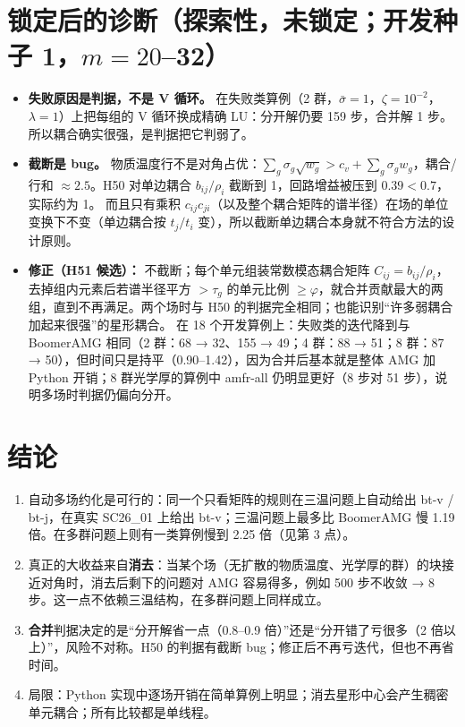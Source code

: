 \documentclass[11pt,a4paper]{ctexart}
\begin{document}
\section{锁定后的诊断（探索性，未锁定；开发种子 1，$m=20$--32）}
\begin{itemize}
\item \textbf{失败原因是判据，不是 V 循环。} 在失败类算例（2 群，$\bar\sigma=1$，$\zeta=10^{-2}$，$\lambda=1$）上把每组的 V 循环换成精确 LU：分开解仍要 159 步，合并解 1 步。所以耦合确实很强，是判据把它判弱了。
\item \textbf{截断是 bug。} 物质温度行不是对角占优：$\sum_g\sigma_g\sqrt{w_g}>c_v+\sum_g\sigma_g w_g$，耦合/行和 $\approx2.5$。H50 对单边耦合 $b_{ij}/\rho_i$ 截断到 1，回路增益被压到 $0.39<0.7$，实际约为 1。
而且只有乘积 $c_{ij}c_{ji}$（以及整个耦合矩阵的谱半径）在场的单位变换下不变（单边耦合按 $t_j/t_i$ 变），所以截断单边耦合本身就不符合方法的设计原则。
\item \textbf{修正（H51 候选）：} 不截断；每个单元组装常数模态耦合矩阵 $C_{ij}=b_{ij}/\rho_i$，去掉组内元素后若谱半径平方 $>\tau_g$ 的单元比例 $\ge\varphi$，就合并贡献最大的两组，直到不再满足。两个场时与 H50 的判据完全相同；也能识别“许多弱耦合加起来很强”的星形耦合。
在 18 个开发算例上：失败类的迭代降到与 BoomerAMG 相同（2 群：68 → 32、155 → 49；4 群：88 → 51；8 群：87 → 50），但时间只是持平（0.90--1.42），因为合并后基本就是整体 AMG 加 Python 开销；8 群光学厚的算例中 amfr-all 仍明显更好（8 步对 51 步），说明多场时判据仍偏向分开。
\end{itemize}

\section{结论}
\begin{enumerate}
\item 自动多场约化是可行的：同一个只看矩阵的规则在三温问题上自动给出 bt-v / bt-j，在真实 SC26\_01 上给出 bt-v；三温问题上最多比 BoomerAMG 慢 1.19 倍。在多群问题上则有一类算例慢到 2.25 倍（见第 3 点）。
\item 真正的大收益来自\textbf{消去}：当某个场（无扩散的物质温度、光学厚的群）的块接近对角时，消去后剩下的问题对 AMG 容易得多，例如 500 步不收敛 → 8 步。这一点不依赖三温结构，在多群问题上同样成立。
\item \textbf{合并}判据决定的是“分开解省一点（0.8--0.9 倍）”还是“分开错了亏很多（2 倍以上）”，风险不对称。H50 的判据有截断 bug；修正后不再亏迭代，但也不再省时间。
\item 局限：Python 实现中逐场开销在简单算例上明显；消去星形中心会产生稠密单元耦合；所有比较都是单线程。
\end{enumerate}
\end{document}
